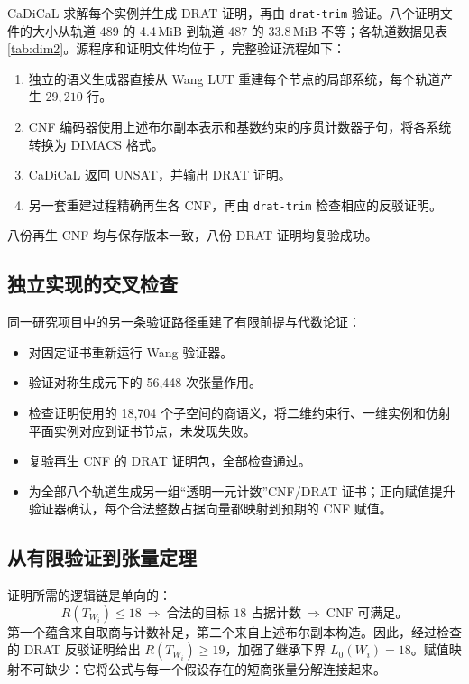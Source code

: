 \documentclass[11pt,a4paper]{article}
\begin{document}
CaDiCaL 求解每个实例并生成 DRAT 证明，再由 \texttt{drat-trim} 验证。八个证明文件的大小从轨道 489 的 4.4\,MiB 到轨道 487 的 33.8\,MiB 不等；各轨道数据见表\ref{tab:dim2}。源程序和证明文件均位于 ，完整验证流程如下：
\begin{enumerate}
  \item 独立的语义生成器直接从 Wang LUT 重建每个节点的局部系统，每个轨道产生 $29{,}210$ 行。
  \item CNF 编码器使用上述布尔副本表示和基数约束的序贯计数器子句，将各系统转换为 DIMACS 格式。
  \item CaDiCaL 返回 UNSAT，并输出 DRAT 证明。
  \item 另一套重建过程精确再生各 CNF，再由 \texttt{drat-trim} 检查相应的反驳证明。
\end{enumerate}
八份再生 CNF 均与保存版本一致，八份 DRAT 证明均复验成功。

\subsection{独立实现的交叉检查}

同一研究项目中的另一条验证路径重建了有限前提与代数论证：
\begin{itemize}
  \item 对固定证书重新运行 Wang 验证器。
  \item 验证对称生成元下的 56,448 次张量作用。
  \item 检查证明使用的 18,704 个子空间的商语义，将二维约束行、一维实例和仿射平面实例对应到证书节点，未发现失败。
  \item 复验再生 CNF 的 DRAT 证明包，全部检查通过。
  \item 为全部八个轨道生成另一组“透明一元计数”CNF/DRAT 证书；正向赋值提升验证器确认，每个合法整数占据向量都映射到预期的 CNF 赋值。
\end{itemize}

\subsection{从有限验证到张量定理}

证明所需的逻辑链是单向的：
\begin{equation}\label{eq:finite-proof-implication}
 R(T_{W_i})\le18
 \ \Longrightarrow\ \text{合法的目标 18 占据计数}
 \ \Longrightarrow\ \text{CNF 可满足。}
\end{equation}
第一个蕴含来自取商与计数补足，第二个来自上述布尔副本构造。因此，经过检查的 DRAT 反驳证明给出 $R(T_{W_i})\ge19$，加强了继承下界 $L_0(W_i)=18$。赋值映射不可缺少：它将公式与每一个假设存在的短商张量分解连接起来。
\end{document}
